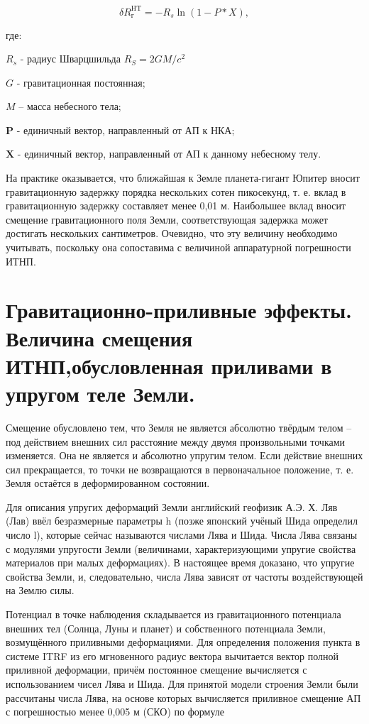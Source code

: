 \documentclass[14pt,a4paper,oneside]{extarticle}
\begin{document}
\[\delta R_\text{г}^{\mathrm{HT}}=-R_s\ln(1-P*X),\]

где:

$R_s$ - радиус Шварцшильда $R_S=2GM/{c}^2$

$G$ - гравитационная постоянная;

$M$ – масса небесного тела;

$\boldsymbol{P}$ - единичный вектор, направленный от АП к НКА;

$\boldsymbol{X}$ - единичный вектор, направленный от АП к данному небесному телу.

На практике оказывается, что ближайшая к Земле планета-гигант Юпитер вносит гравитационную задержку порядка нескольких сотен пикосекунд, т. е. вклад в гравитационную задержку составляет менее 0,01 м. Наибольшее вклад вносит смещение гравитационного поля Земли, соответствующая задержка может достигать нескольких сантиметров. Очевидно, что эту величину необходимо учитывать, поскольку она сопоставима с величиной аппаратурной погрешности ИТНП.

\section{Гравитационно-приливные эффекты. Величина смещения ИТНП,обусловленная приливами в упругом теле Земли.}

Смещение обусловлено тем, что Земля не является абсолютно твёрдым телом – под действием внешних сил расстояние между двумя произвольными точками изменяется. Она не является и абсолютно упругим телом. Если действие внешних сил прекращается, то точки не возвращаются в первоначальное положение, т. е. Земля остаётся в деформированном состоянии.

Для описания упругих деформаций Земли английский геофизик А.Э. Х. Ляв (Лав) ввёл безразмерные параметры h (позже японский учёный Шида определил число l), которые сейчас называются числами Лява и Шида. Числа Лява связаны с модулями упругости Земли (величинами, характеризующими упругие свойства материалов при малых деформациях). В настоящее время доказано, что упругие свойства Земли, и, следовательно, числа Лява зависят от частоты воздействующей на Землю силы.

Потенциал в точке наблюдения складывается из гравитационного потенциала внешних тел (Солнца, Луны и планет) и собственного потенциала Земли, возмущённого приливными деформациями. Для определения положения пункта в системе ITRF из его мгновенного радиус вектора вычитается вектор полной приливной деформации, причём постоянное смещение вычисляется с использованием чисел Лява и Шида.
Для принятой модели строения Земли были рассчитаны числа Лява, на основе которых вычисляется приливное смещение АП с погрешностью менее 0,005 м (СКО) по формуле
\end{document}
